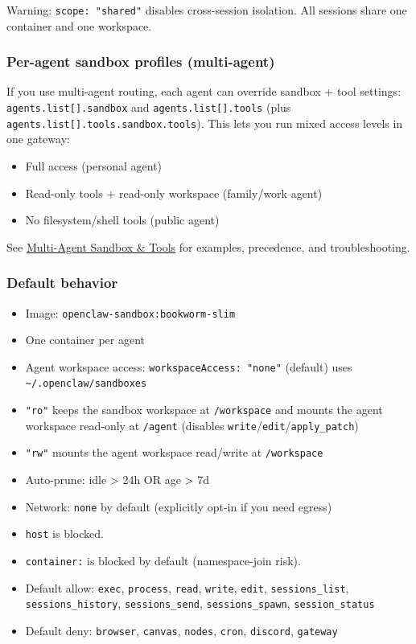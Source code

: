 Warning: \texttt{scope: "shared"} disables cross-session isolation. All sessions share
one container and one workspace.

\subsubsection{Per-agent sandbox profiles (multi-agent)}


If you use multi-agent routing, each agent can override sandbox + tool settings:
\texttt{agents.list[].sandbox} and \texttt{agents.list[].tools} (plus \texttt{agents.list[].tools.sandbox.tools}). This lets you run
mixed access levels in one gateway:

\begin{itemize}
  \item Full access (personal agent)
  \item Read-only tools + read-only workspace (family/work agent)
  \item No filesystem/shell tools (public agent)
\end{itemize}


See \href{/tools/multi-agent-sandbox-tools}{Multi-Agent Sandbox \& Tools} for examples,
precedence, and troubleshooting.

\subsubsection{Default behavior}


\begin{itemize}
  \item Image: \texttt{openclaw-sandbox:bookworm-slim}
  \item One container per agent
  \item Agent workspace access: \texttt{workspaceAccess: "none"} (default) uses \texttt{\textasciitilde{}/.openclaw/sandboxes}
  \item \texttt{"ro"} keeps the sandbox workspace at \texttt{/workspace} and mounts the agent workspace read-only at \texttt{/agent} (disables \texttt{write}/\texttt{edit}/\texttt{apply\_patch})
  \item \texttt{"rw"} mounts the agent workspace read/write at \texttt{/workspace}
  \item Auto-prune: idle > 24h OR age > 7d
  \item Network: \texttt{none} by default (explicitly opt-in if you need egress)
  \item \texttt{host} is blocked.
  \item \texttt{container:} is blocked by default (namespace-join risk).
  \item Default allow: \texttt{exec}, \texttt{process}, \texttt{read}, \texttt{write}, \texttt{edit}, \texttt{sessions\_list}, \texttt{sessions\_history}, \texttt{sessions\_send}, \texttt{sessions\_spawn}, \texttt{session\_status}
  \item Default deny: \texttt{browser}, \texttt{canvas}, \texttt{nodes}, \texttt{cron}, \texttt{discord}, \texttt{gateway}
\end{itemize}


